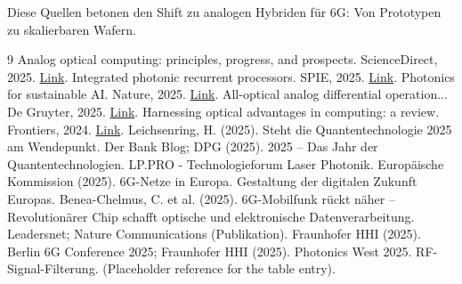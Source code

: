 	Diese Quellen betonen den Shift zu analogen Hybriden für 6G: Von Prototypen zu skalierbaren Wafern.
	\begin{thebibliography}{9}
	 Analog optical computing: principles, progress, and prospects. ScienceDirect, 2025. \href{https://www.sciencedirect.com/science/article/abs/pii/S0030399225018110}{Link}.
	 Integrated photonic recurrent processors. SPIE, 2025. \href{https://www.spiedigitallibrary.org/journals/advanced-photonics/volume-7/issue-5/054003/Integrated-photonic-recurrent-processors/10.1117/1.AP.7.5.054003.full}{Link}.
	 Photonics for sustainable AI. Nature, 2025. \href{https://www.nature.com/articles/s42005-025-02300-0}{Link}.
	 All-optical analog differential operation... De Gruyter, 2025. \href{https://www.degruyter.com/document/doi/10.1515/nanoph-2024-0540/html}{Link}.
	 Harnessing optical advantages in computing: a review. Frontiers, 2024. \href{https://www.frontiersin.org/journals/physics/articles/10.3389/fphy.2024.1379051/full}{Link}.
	 Leichsenring, H. (2025). Steht die Quantentechnologie 2025 am Wendepunkt. Der Bank Blog; DPG (2025). 2025 – Das Jahr der Quantentechnologien. LP.PRO - Technologieforum Laser Photonik.
	 Europäische Kommission (2025). 6G-Netze in Europa. Gestaltung der digitalen Zukunft Europas.
	 Benea-Chelmus, C. et al. (2025). 6G-Mobilfunk rückt näher – Revolutionärer Chip schafft optische und elektronische Datenverarbeitung. Leadersnet; Nature Communications (Publikation).
	 Fraunhofer HHI (2025). Berlin 6G Conference 2025; Fraunhofer HHI (2025). Photonics West 2025.
	 RF-Signal-Filterung. (Placeholder reference for the table entry).
\end{thebibliography}